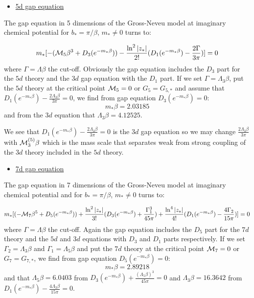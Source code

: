 \documentclass[twoside]{article}
\begin{document}
 
 \begin{itemize}
 	\item \underline{5d gap equation}
 \end{itemize}
 
 The gap equation in 5 dimensions of the Gross-Neveu model at imaginary chemical potential for $b_*=\pi/\beta$, $m_*\not=0$ turns to:
 
\begin{equation}
m_*[-({\cal M}_5\beta^3+D_3(e^{-m_*\beta}))-\frac{\ln^2|z_*|}{2!}(D_1(e^{-m_*\beta})-\frac{2\Gamma}{3\pi})]=0
\end{equation}
where $\Gamma=\Lambda\beta$ the cut-off. Obviously the gap equation includes the $D_3$ part for the $5d$ theory and the $3d$ gap equation with the $D_1$ part. If we set $\Gamma=\Lambda_3\beta$, put the $5d$ theory at the critical point ${\cal M}_5=0$ or $G_5=G_{5,*}$ and assume that $D_1(e^{-m_*\beta})-\frac{2\Lambda_3\beta}{3\pi}=0$, we find from gap equation $D_3(e^{-m_*\beta})=0$: 
\begin{equation}
\boxed
{m_*\beta=2.03185}
\end{equation}
and from the $3d$ equation that $\Lambda_3\beta=4.12525$. 
 
We see that $D_1(e^{-m_*\beta})-\frac{2\Lambda_3\beta}{3\pi}=0$ is the $3d$ gap equation so we may change $\frac{2\Lambda_3\beta}{3\pi}$ with ${\cal M}_3^{(5)}\beta$ which is the mass scale that separates weak from strong coupling of the $3d$ theory included in the $5d$ theory. 
 
 \begin{itemize}
 	\item \underline{7d gap equation}
 \end{itemize}
 
 The gap equation in 7 dimensions of the Gross-Neveu model at imaginary chemical potential and for $b_*=\pi/\beta$, $m_*\not=0$ turns to:
 
\begin{equation}
m_*[(-{\cal M}_7\beta^5+D_5(e^{-m_*\beta}))+\frac{\ln^2|z_*|}{3!}(D_3(e^{-m_*\beta})+\frac{\Gamma_1^3}{45\pi})+\frac{\ln^4|z_*|}{4!}(D_1(e^{-m_*\beta})-\frac{4\Gamma_2}{15\pi})]=0
\end{equation}
where $\Gamma=\Lambda\beta$ the cut-off. Again the gap equation includes the $D_5$ part for the $7d$ theory and the $5d$ and $3d$ equations with $D_3$ and $D_1$ parts respectively. If we set $\Gamma_2=\Lambda_3\beta$ and $\Gamma_1=\Lambda_5\beta$ and put the $7d$ theory at the critical point ${\cal M}_7=0$ or $G_7=G_{7,*}$, we find from gap equation $D_5(e^{-m_*\beta})=0$:
\begin{equation}
\boxed 
{m_*\beta=2.89218}
\end{equation}
and that $\Lambda_5\beta=6.0403$ from $D_3(e^{-m_*\beta})+\frac{(\Lambda_5\beta)^3}{45\pi}=0$ and $\Lambda_3\beta=16.3642$ from $D_1(e^{-m_*\beta})-\frac{4\Lambda_3\beta}{15\pi}=0$.
\end{document}
